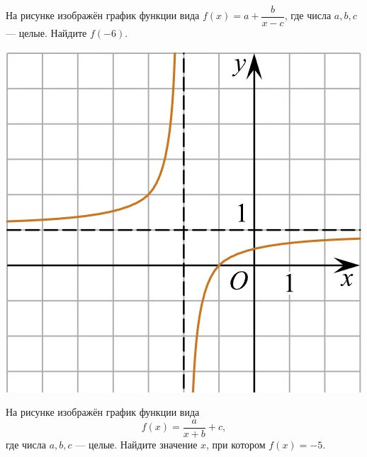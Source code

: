 \begin{class}[number=9]
	\begin{listofex}
		\item
		\begin{minipage}[t]{0.43\textwidth}
			На рисунке изображён график функции вида \(f(x)=a+\dfrac{b}{x-c}\), где числа \(a, b, c\) --- целые. Найдите \(f(-6)\).
		\end{minipage}
		\begin{minipage}[t]{0.1\textwidth}
			\includegraphics[align=t, width=\linewidth]{../../pics/G101M4H2-10.jpg}
		\end{minipage}
		\item
		\begin{minipage}[t]{\bodywidth}
			На рисунке изображён график функции вида \[ f(x)=\dfrac{a}{x+b}+c, \] где числа \(a, b, c\) --- целые. Найдите значение \(x\), при котором \(f(x)=-5\).
		\end{minipage}
		\hspace{0.02\linewidth}
		\begin{minipage}[t]{\picwidth}

\end{minipage}
\end{listofex}
\end{class}
